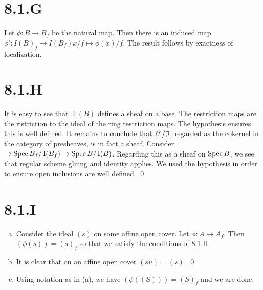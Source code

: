 \documentclass{article}
\begin{document}
\section{8.1.G}
Let $\phi: B \to B_f$ be the natural map. Then there is an induced map
$\phi': I(B)_f \to I(B_f) x/f \mapsto \phi(x)/f$. The result follows by exactness of localization.

\section{8.1.H}
It is easy to see that $\operatorname{I}(B)$ defines a sheaf on a base. The
restriction maps are the ristriction to the ideal of the ring restriction maps.
The hypothesis ensures this is well defined. It remains to conclude that
$\operatorname{\mathscr{O}} / \mathfrak{I}$, regarded as the cokernel in the category of presheaves,
is in fact a sheaf. Consider $\to \operatorname{Spec} B_f / \operatorname{I}(B_f) \to \operatorname{Spec} B/\operatorname{I}(B)$. Regarding this as a sheaf
on $\operatorname{Spec} B$, we see that regular scheme gluing and identity
applies. We used the hypothesis in order to ensure open inclusions are well
defined. \qed

\section{8.1.I}
\begin{enumerate}[a.]
    \item Consider the ideal $(s)$ on some affine open cover. Let
          $\phi: A \to A_f$. Then $(\phi(s))=(s)_f$ so that we satisfy the
          conditions of 8.1.H.
    \item It is clear that on an affine open cover $(su)=(s)$. \qed
    \item Using notation as in (a), we have $(\phi((S)))=(S)_f$ and we are done.
\end{enumerate}
\end{document}
